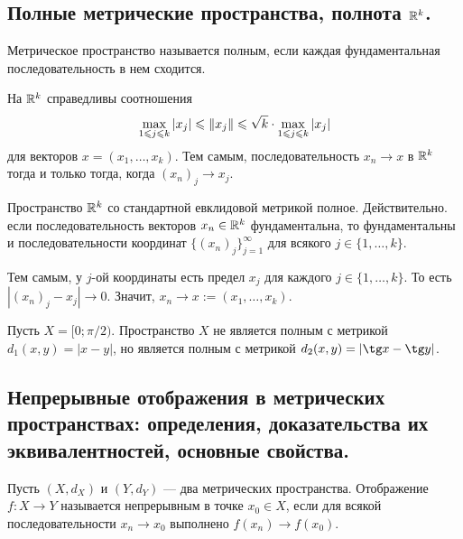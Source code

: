 \documentclass[a4paper]{article}
\theoremstyle{named}
\begin{document}
    \subsection{Полные метрические пространства, полнота $\mathbb{R}^k$.}

    \begin{definition*}
        Метрическое пространство называется полным, если каждая фундаментальная последовательность в нем сходится.
    \end{definition*}

    \begin{remark*}
        На $\mathbb{R}^k$ справедливы соотношения
        \begin{equation*}
            \max\limits_{1 \leqslant j \leqslant k} |x_j| \leqslant \left\lVert x_j\right\rVert \leqslant \sqrt{k} \cdot \max\limits_{1 \leqslant j \leqslant k} |x_j|
        \end{equation*}
        для векторов $x = (x_1, \dots, x_k)$. Тем самым, последовательность $x_n \to x$ в $\mathbb{R}^k$ тогда и только тогда, когда $(x_n)_j \to x_j$.
    \end{remark*}

    \begin{example*}
        Пространство $\mathbb{R}^k$ со стандартной евклидовой метрикой полное. Действительно. если последовательность векторов $x_n \in \mathbb{R}^k$ фундаментальна, то фундаментальны и последовательности координат $\{(x_n)_j\}_{j = 1}^{\infty}$ для всякого $j \in \{1, \dots, k\}$.

        Тем самым, у $j$-ой координаты есть предел $x_j$ для каждого $j \in \{1, \dots, k\}$. То есть $|(x_n)_j - x_j| \to 0$. Значит, $x_n \to x := (x_1, \dots, x_k)$.
    \end{example*}

    \begin{example*}
        Пусть $X = [0; \pi / 2)$. Пространство $X$ не является полным с метрикой $d_1(x, y) = |x - y|$, но является полным с метрикой $d_2(x, y) = |\tg x - \tg y|$.
    \end{example*}

    \subsection{Непрерывные отображения в метрических пространствах: определения, доказательства их эквивалентностей, основные свойства.}

    \begin{definition*}
        Пусть $(X, d_X)$ и $(Y, d_Y)$ --- два метрических пространства. Отображение $f: X \to Y$ называется непрерывным в точке $x_0 \in X$, если для всякой последовательности $x_n \to x_0$ выполнено $f(x_n) \to f(x_0)$.
    \end{definition*}
\end{document}
